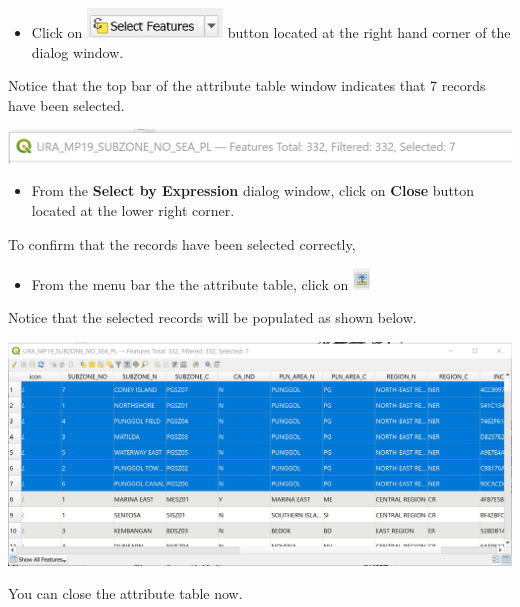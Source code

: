 \documentclass[
  letterpaper,
  DIV=11,
  numbers=noendperiod]{scrreprt}
\providecommand{\tightlist}{%
  \setlength{\itemsep}{0pt}\setlength{\parskip}{0pt}}\usepackage{longtable,booktabs,array}
\begin{document}
\begin{itemize}
\tightlist
\item
  Click on
  \includegraphics[width=1.41667in,height=\textheight]{./img04/image11.jpg}
  button located at the right hand corner of the dialog window.
\end{itemize}

Notice that the top bar of the attribute table window indicates that 7
records have been selected.

\includegraphics{./img04/image12.jpg}

\begin{itemize}
\tightlist
\item
  From the \textbf{Select by Expression} dialog window, click on
  \textbf{Close} button located at the lower right corner.
\end{itemize}

To confirm that the records have been selected correctly,

\begin{itemize}
\tightlist
\item
  From the menu bar the the attribute table, click on
  \includegraphics[width=0.17708in,height=\textheight]{./img04/image13.jpg}
\end{itemize}

Notice that the selected records will be populated as shown below.

\includegraphics{./img04/image14.jpg}

You can close the attribute table now.
\end{document}
